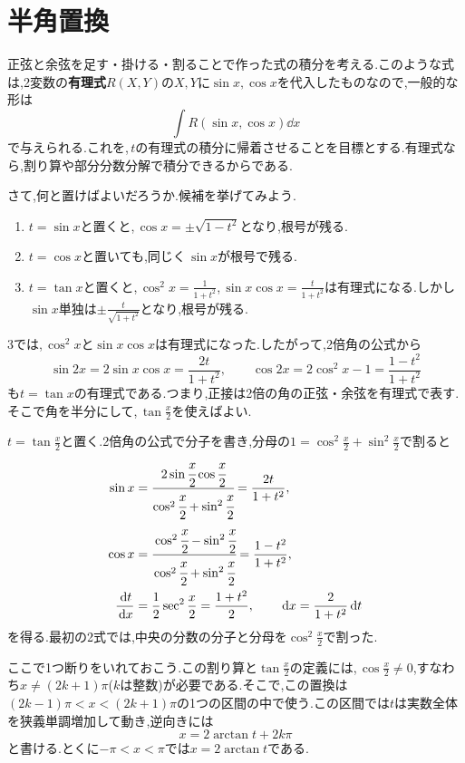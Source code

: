 \section{半角置換}\label{節:半角置換}

正弦と余弦を足す・掛ける・割ることで作った式の積分を考える.このような式は,2変数の\textbf{有理式}$R(X,Y)$の$X,Y$に$\sin x,\cos x$を代入したものなので,一般的な形は
\[
\int R(\sin x,\cos x)\dd x
\]
で与えられる.これを,\,$t$の有理式の積分に帰着させることを目標とする.有理式なら,割り算や部分分数分解で積分できるからである.

さて,何と置けばよいだろうか.候補を挙げてみよう.
\begin{enumerate}
\item $t=\sin x$と置くと,\,$\cos x=\pm\sqrt{1-t^2}$となり,根号が残る.
\item $t=\cos x$と置いても,同じく\,$\sin x$が根号で残る.
\item $t=\tan x$と置くと,\,$\cos^2x=\frac1{1+t^2}$,\,$\sin x\cos x=\frac t{1+t^2}$は有理式になる.しかし$\sin x$単独は$\pm\frac{t}{\sqrt{1+t^2}}$となり,根号が残る.
\end{enumerate}
3では,\,$\cos^2x$と$\sin x\cos x$は有理式になった.したがって,2倍角の公式から
\[
\sin2x=2\sin x\cos x=\frac{2t}{1+t^2},\qquad
\cos2x=2\cos^2x-1=\frac{1-t^2}{1+t^2}
\]
も$t=\tan x$の有理式である.つまり,正接は2倍の角の正弦・余弦を有理式で表す.そこで角を半分にして,\,$\tan\frac x2$を使えばよい.

$t=\tan\frac x2$と置く.2倍角の公式で分子を書き,分母の$1=\cos^2\frac x2+\sin^2\frac x2$で割ると
\begin{equation}\label{式:半角置換}
\begin{aligned}
\sin x&=\cfrac{2\sin\cfrac x2\cos\cfrac x2}
 {\cos^2\cfrac x2+\sin^2\cfrac x2}
 =\frac{2t}{1+t^2},\\
\cos x&=\cfrac{\cos^2\cfrac x2-\sin^2\cfrac x2}
 {\cos^2\cfrac x2+\sin^2\cfrac x2}
 =\frac{1-t^2}{1+t^2},\\
\frac{\,\mathrm{d} t}{\,\mathrm{d} x}&=\frac12\sec^2\frac x2
 =\frac{1+t^2}{2},\qquad
\,\mathrm{d} x=\frac{2}{1+t^2}\,\mathrm{d} t
\end{aligned}
\end{equation}
を得る.最初の2式では,中央の分数の分子と分母を$\cos^2\frac x2$で割った.

ここで1つ断りをいれておこう.この割り算と$\tan\frac x2$の定義には,\,$\cos\frac x2\ne0$,すなわち$x\ne(2k+1)\pi$($k$は整数)が必要である.そこで,この置換は$(2k-1)\pi<x<(2k+1)\pi$の1つの区間の中で使う.この区間では$t$は実数全体を狭義単調増加して動き,逆向きには
\[
x=2\arctan t+2k\pi
\]
と書ける.とくに$-\pi<x<\pi$では$x=2\arctan t$である.

